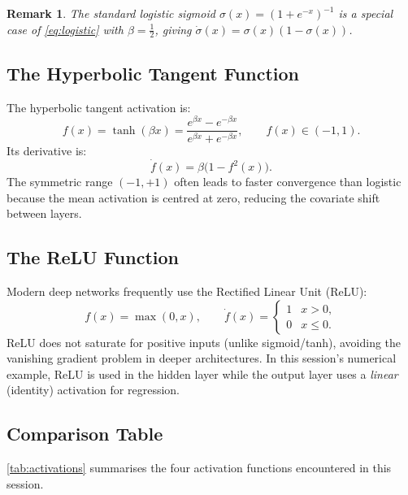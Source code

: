 \documentclass[12pt,a4paper]{article}
\newtheorem{remark}{Remark}[section]
\begin{document}
\begin{remark}
  The standard logistic sigmoid $\sigma(x) = (1+e^{-x})^{-1}$ is a special
  case of \cref{eq:logistic} with $\beta = \tfrac{1}{2}$, giving
  $\dot{\sigma}(x) = \sigma(x)(1-\sigma(x))$.
\end{remark}

\subsection{The Hyperbolic Tangent Function}
\label{subsec:tanh}

The hyperbolic tangent activation is:
\begin{equation}
  f(x) = \tanh(\beta x) = \frac{e^{\beta x} - e^{-\beta x}}{e^{\beta x} + e^{-\beta x}},
  \qquad f(x) \in (-1, 1).
  \label{eq:tanh}
\end{equation}
Its derivative is:
\begin{equation}
  \dot{f}(x) = \beta\bigl(1 - f^2(x)\bigr).
  \label{eq:tanh-deriv}
\end{equation}
The symmetric range $(-1,+1)$ often leads to faster convergence than logistic
because the mean activation is centred at zero, reducing the covariate shift
between layers.

\subsection{The ReLU Function}
\label{subsec:relu}

Modern deep networks frequently use the Rectified Linear Unit (ReLU):
\begin{equation}
  f(x) = \max(0, x),
  \qquad \dot{f}(x) = \begin{cases} 1 & x > 0, \\ 0 & x \leq 0. \end{cases}
  \label{eq:relu}
\end{equation}
ReLU does not saturate for positive inputs (unlike sigmoid/tanh), avoiding
the vanishing gradient problem in deeper architectures.  In this session's
numerical example, ReLU is used in the hidden layer while the output layer
uses a \emph{linear} (identity) activation for regression.

\subsection{Comparison Table}
\label{subsec:activation-table}

\cref{tab:activations} summarises the four activation functions encountered in
this session.
\end{document}
